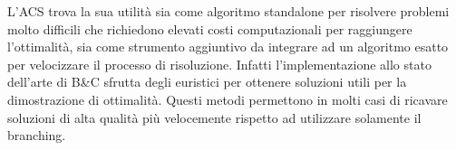 L'ACS trova la sua utilità sia come algoritmo standalone per risolvere
problemi molto difficili che richiedono elevati costi computazionali per
raggiungere l'ottimalità, sia come strumento aggiuntivo da integrare ad
un algoritmo esatto per velocizzare il processo di risoluzione.
Infatti l'implementazione allo stato dell'arte di B\&C \cite{cplex22.1.1}
sfrutta degli euristici per ottenere soluzioni utili per la dimostrazione 
di ottimalità.
Questi metodi permettono in molti casi di ricavare soluzioni di alta qualità
più velocemente rispetto ad utilizzare solamente il branching.
